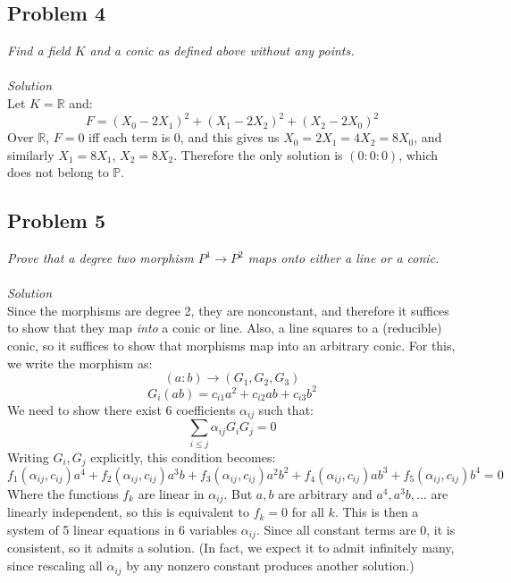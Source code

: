 \documentclass[12 pt]{article}
\newcommand{\R}{\mathbb{R}}
\begin{document}
\subsection*{Problem 4}
\emph{Find a field $K$ and a conic as defined above without any points.}
\\
\\
\emph{Solution}
\\
Let $K = \R$ and:
\[     F = (X_0 - 2X_1)^2 + (X_1 - 2X_2)^2 + (X_2 - 2X_0)^2     \]
Over $\R$, $F = 0$ iff each term is 0, and this gives us $X_0 = 2X_1 = 4X_2 = 8X_0$, and similarly $X_1 = 8X_1$, $X_2 = 8X_2$. Therefore the only solution is $( 0 : 0 : 0)$, which does not belong to $\mathbb{P}$.

\subsection*{Problem 5}
\emph{Prove that a degree two morphism $P^1 \to P^2$ maps onto either a line or a conic.}
\\
\\
\emph{Solution}
\\
Since the morphisms are degree 2, they are nonconstant, and therefore it suffices to show that they map \emph{into} a conic or line. Also, a line squares to a (reducible) conic, so it suffices to show that morphisms map into an arbitrary conic. For this, we write the morphism as:
\[    (a : b) \to (G_1, G_2, G_3)      \]
\[      G_i(ab) = c_{i1} a^2 + c_{i2} ab + c_{i3} b^2       \]
We need to show there exist 6 coefficients $\alpha_{ij}$ such that:
\[       \sum_{i\leq j} \alpha_{ij} G_i G_j = 0      \]
Writing $G_i, G_j$ explicitly, this condition becomes:
\[          f_1 (\alpha_{ij} , c_{ij}) a^4 + f_2 (\alpha_{ij} , c_{ij}) a^3 b + f_3 (\alpha_{ij} , c_{ij}) a^2b^2 + f_4 (\alpha_{ij} , c_{ij}) ab^3 + f_5 (\alpha_{ij} , c_{ij}) b^4 = 0          \]
Where the functions $f_k$ are linear in $\alpha_{ij}$. But $a,b$ are arbitrary and $a^4, a^3b, \dots$ are linearly independent, so this is equivalent to $f_k = 0$ for all $k$. This is then a system of 5 linear equations in 6 variables $\alpha_{ij}$. Since all constant terms are 0, it is consistent, so it admits a solution. (In fact, we expect it to admit infinitely many, since rescaling all $\alpha_{ij}$ by any nonzero constant produces another solution.)
\end{document}

